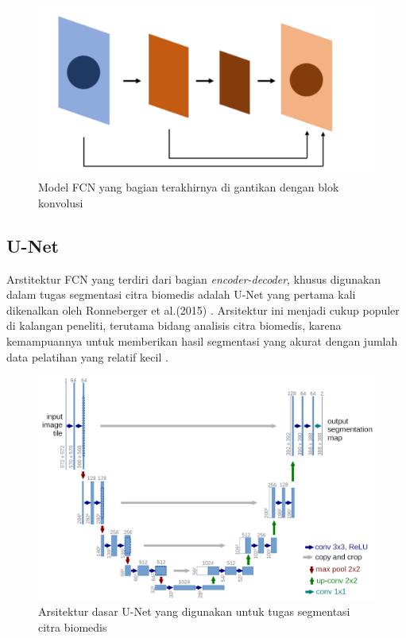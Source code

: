 \begin{figure}[H]
	\centering
	\includegraphics[scale=.2]{gambar/gambar-fcn.png}
	\caption{Model FCN yang bagian terakhirnya di gantikan dengan blok konvolusi \cite{huang_fully_2022}}
	\label{fig:fcn}
\end{figure}


\subsection{U-Net}

\noindent Arstitektur FCN yang terdiri dari bagian \textit{encoder-decoder}, khusus digunakan dalam tugas segmentasi citra biomedis adalah U-Net yang pertama kali dikenalkan oleh Ronneberger et al.(2015) \cite{ronneberger_u-net_2015}. Arsitektur ini menjadi cukup populer di kalangan peneliti, terutama bidang analisis citra biomedis, karena kemampuannya untuk memberikan hasil segmentasi yang akurat dengan jumlah data pelatihan yang relatif kecil \cite{williams_unified_2023}.

\begin{figure}[H]
	\centering
	\includegraphics[scale=.2]{gambar/U-Net.png}
	\caption{Arsitektur dasar U-Net yang digunakan untuk tugas segmentasi citra biomedis \cite{ronneberger_u-net_2015}}
	\label{fig:U-net}
\end{figure}

